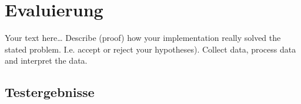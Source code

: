 \chapter{Evaluierung}


Your text here\ldots
Describe (proof) how your implementation really solved the stated problem. I.e. accept or reject your hypotheses). Collect data, process data and interpret the data. %

\section{Testergebnisse}